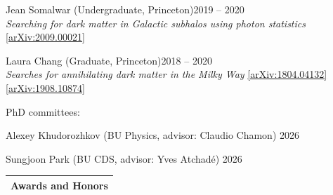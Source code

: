 \documentclass[letterpaper,11pt]{article}
\makeatletter
\newenvironment{packed_itemize}{
\begin{itemize}[label=\raisebox{0.25ex}{\tiny$\bullet$}, topsep=0pt, partopsep=0pt]
  \setlength{\itemsep}{4.0pt}
  \setlength{\parskip}{0pt}
  \setlength{\parsep}{0pt}}{\end{itemize}
}
\newcommand{\cvsection}[2]{%
  \needspace{4\baselineskip}%
  \par\vspace{3mm}%
  \noindent
  \begin{tabular*}{\textwidth}{l@{\extracolsep{\fill}}}
  \large {\sc \Large{#2}}\\
  \hline
  \end{tabular*}\vspace{3mm}%
}
\makeatother
\begin{document}
\begin{packed_itemize}
  \item Jean Somalwar (Undergraduate, {Princeton})\hfill 2019 -- 2020 \\ \emph{Searching for dark matter in Galactic subhalos using photon statistics} \href{https://arxiv.org/abs/2009.00021}{[arXiv:2009.00021]}
  \item Laura Chang (Graduate, {Princeton})\hfill 2018 -- 2020 \\ \emph{Searches for annihilating dark matter in the Milky Way} \href{https://arxiv.org/abs/1804.04132}{[arXiv:1804.04132]}\,\href{https://arxiv.org/abs/1908.10874}{[arXiv:1908.10874]}
  \end{packed_itemize}

\vspace{2mm}

  \noindent
PhD committees:
  \begin{packed_itemize}
  \item Alexey Khudorozhkov ({BU Physics}, advisor: Claudio Chamon) \hfill 2026
  \item Sungjoon Park ({BU CDS}, advisor: Yves Atchad\'e) \hfill 2026
  \end{packed_itemize}
  
  


\cvsection{\faTrophy}{Awards and Honors}
\end{document}
